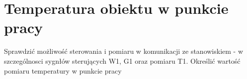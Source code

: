 \section{Temperatura obiektu w punkcie pracy}
Sprawdzić możliwość sterowania i pomiaru w komunikacji ze stanowiskiem - w szczególnosci sygnłów sterujących W1, G1 oraz pomiaru T1. Określić wartość pomiaru
temperatury w punkcie pracy